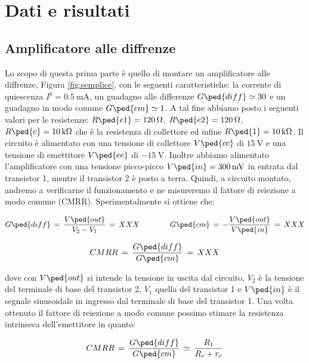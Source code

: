 \section*{Dati e risultati}

\subsection*{Amplificatore alle diffrenze}

Lo scopo di questa prima parte è quello di montare un amplificatore alle diffrenze, Figura \ref{fig:semplice}, con le seguenti caratteristiche: la corrente di quiescenza $I^q=\SI{0.5}{\milli\ampere}$, un guadagno alle differenze $G\ped{diff} \simeq 30$ e un guadagno in modo comune $G\ped{cm} \simeq 1$.
A tal fine abbiamo posto i seguenti valori per le resistenze: $R\ped{e1} = \SI{120}{\ohm}$, $R\ped{e2} = \SI{120}{\ohm}$, $R\ped{c} = \SI{10}{\kilo\ohm}$ che è la resistenza di collettore ed infine $R\ped{1} = \SI{10}{\kilo\ohm}$. Il circuito è alimentato con una tensione di collettore $V\ped{cc}$ di $\SI{15}{\volt}$ e una tensione di emettitore $V\ped{ee}$ di $\SI{-15}{\volt}$.
Inoltre abbiamo alimentato l'amplificatore con una tensione picco-picco $V\ped{in} = \SI{300}{\milli\volt}$ in entrata dal transistor 1, mentre il transistor 2 è posto a terra.
Quindi, a circuito montato, andremo a verificarne il funzionamento e ne misureremo il fattore di reiezione a modo comune (CMRR).
Sperimentalmente si ottiene che:

\begin{equation}
	G\ped{diff}\,=\,\frac{V\ped{out}}{V_2-V_1}\,=\, XXX \qquad\qquad G\ped{cm}\,=\,-\frac{V\ped{out}}{V\ped{in}}\,=\, XXX
	\label{eq:G}
\end{equation}

\begin{equation}
	CMRR\,=\,\frac{G\ped{diff}}{G\ped{cm}}\,=\, XXX
	\label{eq:cmrr}
\end{equation}

dove con $V\ped{out}$ si intende la tensione in uscita dal circuito, $V_2$ è la tensione del terminale di base del transistor 2, $V_1$ quella del transistor 1 e $V\ped{in}$ è il segnale sinusoidale in ingresso dal terminale di base del transistor 1.
Una volta ottenuto il fattore di reiezione a modo comune possimo stimare la resistenza intrinseca dell'emettitore in quanto:

\begin{equation}
	CMRR\,=\,\frac{G\ped{diff}}{G\ped{cm}}\,\simeq\,\frac{R_1}{R_e + r_e}
\end{equation}

